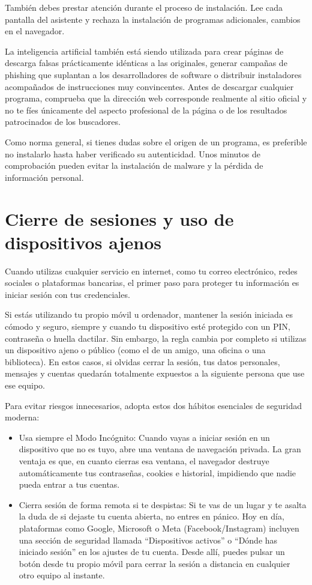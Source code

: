 \documentclass[
  spanish,
  a4paper,
  openany]{book}
\begin{document}
También debes prestar atención durante el proceso de instalación. Lee cada pantalla del asistente y rechaza la instalación de programas adicionales, cambios en el navegador.

La inteligencia artificial también está siendo utilizada para crear páginas de descarga falsas prácticamente idénticas a las originales, generar campañas de phishing que suplantan a los desarrolladores de software o distribuir instaladores acompañados de instrucciones muy convincentes. Antes de descargar cualquier programa, comprueba que la dirección web corresponde realmente al sitio oficial y no te fíes únicamente del aspecto profesional de la página o de los resultados patrocinados de los buscadores.

Como norma general, si tienes dudas sobre el origen de un programa, es preferible no instalarlo hasta haber verificado su autenticidad. Unos minutos de comprobación pueden evitar la instalación de malware y la pérdida de información personal.

\section{Cierre de sesiones y uso de dispositivos ajenos}\label{cierre-de-sesiones-y-uso-de-dispositivos-ajenos}

Cuando utilizas cualquier servicio en internet, como tu correo electrónico, redes sociales o plataformas bancarias, el primer paso para proteger tu información es iniciar sesión con tus credenciales.

Si estás utilizando tu propio móvil u ordenador, mantener la sesión iniciada es cómodo y seguro, siempre y cuando tu dispositivo esté protegido con un PIN, contraseña o huella dactilar. Sin embargo, la regla cambia por completo si utilizas un dispositivo ajeno o público (como el de un amigo, una oficina o una biblioteca). En estos casos, si olvidas cerrar la sesión, tus datos personales, mensajes y cuentas quedarán totalmente expuestos a la siguiente persona que use ese equipo.

Para evitar riesgos innecesarios, adopta estos dos hábitos esenciales de seguridad moderna:

\begin{itemize}
\item
  Usa siempre el Modo Incógnito: Cuando vayas a iniciar sesión en un dispositivo que no es tuyo, abre una ventana de navegación privada. La gran ventaja es que, en cuanto cierras esa ventana, el navegador destruye automáticamente tus contraseñas, cookies e historial, impidiendo que nadie pueda entrar a tus cuentas.
\item
  Cierra sesión de forma remota si te despistas: Si te vas de un lugar y te asalta la duda de si dejaste tu cuenta abierta, no entres en pánico. Hoy en día, plataformas como Google, Microsoft o Meta (Facebook/Instagram) incluyen una sección de seguridad llamada ``Dispositivos activos'' o ``Dónde has iniciado sesión'' en los ajustes de tu cuenta. Desde allí, puedes pulsar un botón desde tu propio móvil para cerrar la sesión a distancia en cualquier otro equipo al instante.
\end{itemize}
\end{document}
